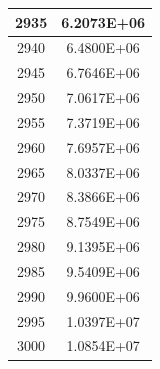 \documentclass[a4paper]{article}
\begin{document}
\begin{tabular}{|c|c|}
		\hline
		2935 & 6.2073E+06 \\
		\hline
		2940 & 6.4800E+06 \\
		\hline
		2945 & 6.7646E+06 \\
		\hline
		2950 & 7.0617E+06 \\
		\hline
		2955 & 7.3719E+06 \\
		\hline
		2960 & 7.6957E+06 \\
		\hline
		2965 & 8.0337E+06 \\
		\hline
		2970 & 8.3866E+06 \\
		\hline
		2975 & 8.7549E+06 \\
		\hline
		2980 & 9.1395E+06 \\
		\hline
		2985 & 9.5409E+06 \\
		\hline
		2990 & 9.9600E+06 \\
		\hline
		2995 & 1.0397E+07 \\
		\hline
		3000 & 1.0854E+07 \\
		\hline
	\end{tabular}
	
	\normalsize
	
	\pagebreak
	
\end{document}
